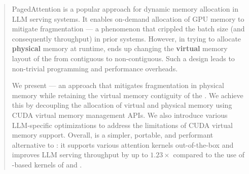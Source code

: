 \begin{abstract}
PagedAttention is a popular approach for dynamic memory allocation in LLM serving systems. It enables on-demand allocation of GPU memory to mitigate \kvcache fragmentation --- a phenomenon that crippled the batch size (and consequently throughput) in prior systems. However, in trying to allocate \textbf{physical} memory at runtime, \pa ends up changing the \textbf{virtual} memory layout of the \kvcache from contiguous to non-contiguous. Such a design leads to non-trivial programming and performance overheads.

We present \sysname{} --- an approach that mitigates fragmentation in physical memory while retaining the virtual memory contiguity of the \kvcache. We achieve this by decoupling the allocation of virtual and physical memory using CUDA virtual memory management APIs. We also introduce various LLM-specific optimizations to address the limitations of CUDA virtual memory support. Overall, \sysname is a simpler, portable, and performant alternative to \pa: it supports various attention kernels out-of-the-box and improves LLM serving throughput by up to $1.23\times$ compared to the use of \pa-based kernels of \flashattention and \flashinfer.


\end{abstract}
